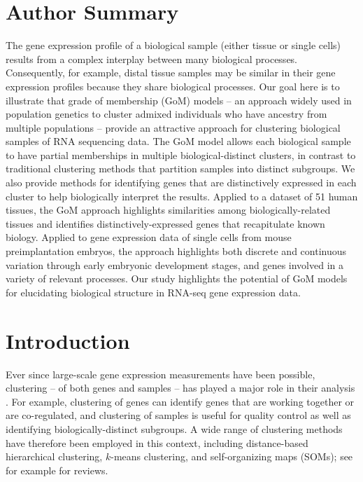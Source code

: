 \documentclass[10pt,letterpaper]{article}
\begin{document}
\section*{Author Summary}
The gene expression profile of a biological sample (either tissue or single cells) results from a complex interplay between many biological processes. Consequently, for example, distal tissue samples may be similar in their gene expression profiles because they share biological processes. Our goal here is to illustrate that grade of membership (GoM) models -- an approach widely used in population genetics to cluster admixed individuals who have ancestry from multiple populations -- provide an attractive approach for clustering biological samples of RNA sequencing data. The GoM model allows each biological sample to have partial memberships in multiple biological-distinct clusters, in contrast to traditional clustering methods that partition samples into distinct subgroups. We also provide methods for identifying genes that are distinctively expressed in each cluster to help biologically interpret the results. Applied to a dataset of 51 human tissues, the GoM approach highlights similarities among biologically-related tissues and identifies distinctively-expressed genes that recapitulate known biology. Applied to gene expression data of single cells from mouse preimplantation embryos, the approach highlights both discrete and continuous variation through early embryonic development stages, and genes involved in a variety of relevant processes. Our study highlights the potential of GoM models for elucidating biological structure in RNA-seq gene expression data.
\linenumbers


\section*{Introduction}

Ever since large-scale gene expression measurements have been possible, clustering -- of both genes and samples --
has played a major role in their analysis \cite{Alizadeh2000, Eisen1998, Golub1999}.
For example, clustering of genes can identify genes that are working together or are co-regulated, and clustering of samples is useful for quality control
as well as identifying biologically-distinct subgroups. A wide range of clustering methods have therefore
been employed in this context, including distance-based hierarchical clustering, $k$-means clustering, and self-organizing maps (SOMs); see for example \cite{D'haeseleer2005, Jiang2004} for reviews.
\end{document}
